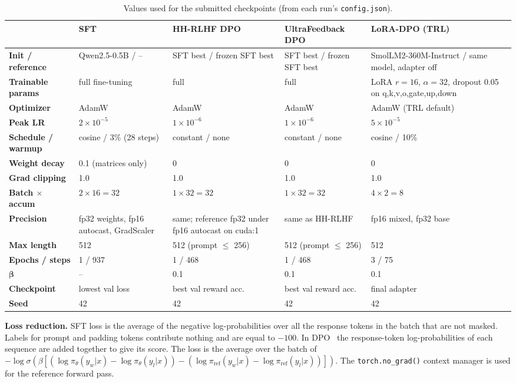 \documentclass[10pt]{article}
\begin{document}
\begin{table}[H]
\centering\small
\caption{Values used for the submitted checkpoints (from each run's \texttt{config.json}).}
\label{tab:config}
\begin{tabularx}{\textwidth}{>{\bfseries}l L L L L}
\toprule
 & \textbf{SFT} & \textbf{HH-RLHF DPO} & \textbf{UltraFeedback DPO} & \textbf{LoRA-DPO (TRL)} \\
\midrule
Init / reference & Qwen2.5-0.5B / -- & SFT best / frozen SFT best & SFT best / frozen SFT best & SmolLM2-360M-Instruct / same model, adapter off \\
Trainable params & full fine-tuning & full & full & LoRA $r{=}16$, $\alpha{=}32$, dropout 0.05 on q,k,v,o,gate,up,down \\
Optimizer & AdamW & AdamW & AdamW & AdamW (TRL default) \\
Peak LR & $2\times10^{-5}$ & $1\times10^{-6}$ & $1\times10^{-6}$ & $5\times10^{-5}$ \\
Schedule / warmup & cosine / 3\% (28 steps) & constant / none & constant / none & cosine / 10\% \\
Weight decay & 0.1 (matrices only) & 0 & 0 & 0 \\
Grad clipping & 1.0 & 1.0 & 1.0 & 1.0 \\
Batch $\times$ accum & $2\times16=32$ & $1\times32=32$ & $1\times32=32$ & $4\times2=8$ \\
Precision & fp32 weights, fp16 autocast, GradScaler & same; reference fp32 under fp16 autocast on cuda:1 & same as HH-RLHF & fp16 mixed, fp32 base \\
Max length & 512 & 512 (prompt $\le$ 256) & 512 (prompt $\le$ 256) & 512 \\
Epochs / steps & 1 / 937 & 1 / 468 & 1 / 468 & 3 / 75 \\
$\boldsymbol{\beta}$ & -- & 0.1 & 0.1 & 0.1 \\
Checkpoint & lowest val loss & best val reward acc. & best val reward acc. & final adapter \\
Seed & 42 & 42 & 42 & 42 \\
\bottomrule
\end{tabularx}
\end{table}

\textbf{Loss reduction.} SFT loss is the average of the negative log-probabilities over all the response tokens in the batch that are not masked. Labels for prompt and padding tokens contribute nothing and are equal to $-100$.
In DPO~\cite{dpo} the response-token log-probabilities of each sequence are added together to give its score.
The loss is the average over the batch of $-\log\sigma(\beta[(\log\pi_\theta(y_w|x)-\log\pi_\theta(y_l|x))-(\log\pi_{\text{ref}}(y_w|x)-\log\pi_{\text{ref}}(y_l|x))])$.
The \texttt{torch.no\_grad()} context manager is used for the reference forward pass.
\end{document}
